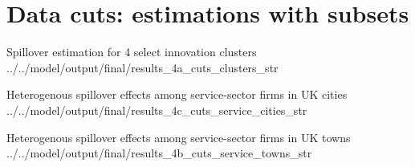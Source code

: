 


\newpage
\section{Data cuts: estimations with subsets}
\label{app:ext-cuts-clusters}

\wraptable
    {Spillover estimation for 4 select innovation clusters}
    {../../model/output/final/results_4a_cuts_clusters_str}
    {}

\wraptable
    {Heterogenous spillover effects among service-sector firms in UK cities}
    {../../model/output/final/results_4c_cuts_service_cities_str}
    {}

\wraptable
    {Heterogenous spillover effects among service-sector firms in UK towns}
    {../../model/output/final/results_4b_cuts_service_towns_str}
    {}